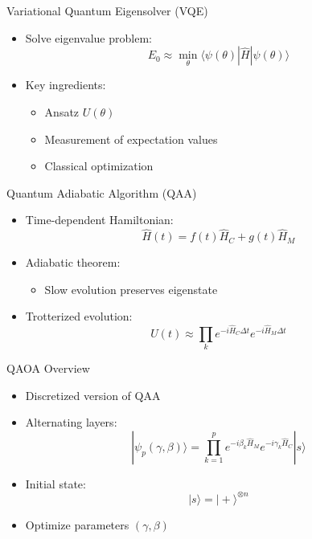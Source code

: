 \documentclass{beamer}
\begin{document}

\begin{frame}{Variational Quantum Eigensolver (VQE)}
\begin{itemize}
\item Solve eigenvalue problem:
\[
E_0 \approx \min_{\theta} \langle \psi(\theta)|\hat{H}|\psi(\theta)\rangle
\]
\item Key ingredients:
\begin{itemize}
\item Ansatz $U(\theta)$
\item Measurement of expectation values
\item Classical optimization
\end{itemize}
\end{itemize}
\end{frame}


\begin{frame}{Quantum Adiabatic Algorithm (QAA)}
\begin{itemize}
\item Time-dependent Hamiltonian:
\[
\hat{H}(t) = f(t)\hat{H}_C + g(t)\hat{H}_M
\]
\item Adiabatic theorem:
\begin{itemize}
\item Slow evolution preserves eigenstate
\end{itemize}
\item Trotterized evolution:
\[
U(t) \approx \prod_k e^{-i \hat{H}_C \Delta t} e^{-i \hat{H}_M \Delta t}
\]
\end{itemize}
\end{frame}


\begin{frame}{QAOA Overview}
\begin{itemize}
\item Discretized version of QAA
\item Alternating layers:
\[
|\psi_p(\gamma,\beta)\rangle =
\prod_{k=1}^p e^{-i\beta_k \hat{H}_M} e^{-i\gamma_k \hat{H}_C} |s\rangle
\]
\item Initial state:
\[
|s\rangle = |+\rangle^{\otimes n}
\]
\item Optimize parameters $(\gamma,\beta)$
\end{itemize}
\end{frame}
\end{document}
